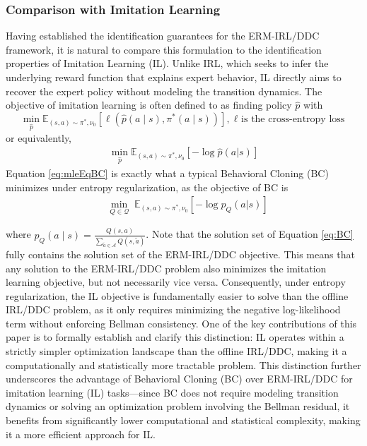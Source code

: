 \subsubsection*{Comparison with Imitation Learning} 
Having established the identification guarantees for the ERM-IRL/DDC framework, it is natural to compare this formulation to the identification properties of Imitation Learning (IL). Unlike IRL, which seeks to infer the underlying reward function that explains expert behavior, IL directly aims to recover the expert policy without modeling the transition dynamics. The objective of imitation learning is often defined to as finding policy $\hat{p}$ with 
$$
\min _{\hat{p}} \mathbb{E}_{(s, a) \sim \pi^\ast, \nu_0}\left[\ell\left(\hat{p}(a \mid s), \pi^\ast(a \mid s)\right)\right], \text{$\ell$ is the cross-entropy loss}
$$
or equivalently, 
\begin{align}
\min _{\hat{p}} \mathbb{E}_{(s, a) \sim \pi^\ast , \nu_0}\left[-\log \hat{p}(a|s)\right]\label{eq:mleEqBC}    
\end{align}
Equation \eqref{eq:mleEqBC} is exactly what a typical Behavioral Cloning (BC) \citep{torabi2018behavioral} minimizes under entropy regularization, as the objective of BC is
\begin{align}
  & \!\!\underset{Q\in \mathcal{Q}}{\min }  \;\mathbb{E}_{(s, a)\sim \pi^*, \nu_0}  \left[-\log \hat{p}_Q(a|s)\right] \label{eq:BC}
\end{align}



\noindent where $\hat{p}_Q(a\mid s) = \frac{Q(s,a)}{\sum_{\tilde{a}\in\mathcal{A} }Q(s,\tilde{a})}$. Note that the solution set of Equation \eqref{eq:BC} fully contains the solution set of the ERM-IRL/DDC objective. This means that any solution to the ERM-IRL/DDC problem also minimizes the imitation learning objective, but not necessarily vice versa. Consequently, under entropy regularization, the IL objective is fundamentally easier to solve than the offline IRL/DDC problem, as it only requires minimizing the negative log-likelihood term without enforcing Bellman consistency. One of the key contributions of this paper is to formally establish and clarify this distinction: IL operates within a strictly simpler optimization landscape than the offline IRL/DDC, making it a computationally and statistically more tractable problem. This distinction further underscores the advantage of Behavioral Cloning (BC) over ERM-IRL/DDC for imitation learning (IL) tasks—since BC does not require modeling transition dynamics or solving an optimization problem involving the Bellman residual, it benefits from significantly lower computational and statistical complexity, making it a more efficient approach for IL.



